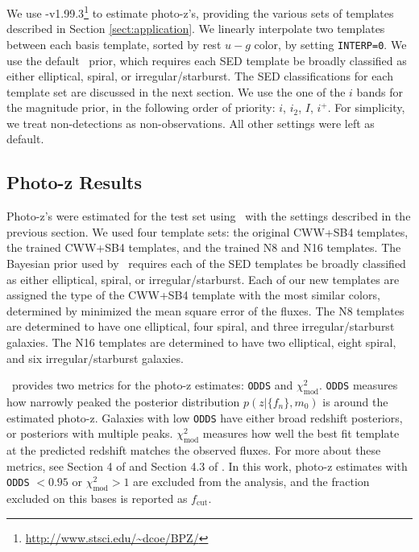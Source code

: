 We use \bpz-v1.99.3\footnote{\url{http://www.stsci.edu/~dcoe/BPZ/}} \citep{Benitez2000a} to estimate photo-z's, providing the various sets of templates described in Section \ref{sect:application}.
We linearly interpolate two templates between each basis template, sorted by rest $u-g$ color, by setting \texttt{INTERP=0}. 
We use the default \bpz\ prior, which requires each SED template be broadly classified as either elliptical, spiral, or irregular/starburst. 
The SED classifications for each template set are discussed in the next section. 
We use the one of the $i$ bands for the magnitude prior, in the following order of priority: $i$, $i_2$, $I$, $i^+$.
For simplicity, we treat non-detections as non-observations.
All other settings were left as default.

\subsection{Photo-z Results}
\label{sect:photoz_results}

Photo-z's were estimated for the test set using \bpz\ with the settings described in the previous section.
We used four template sets: the original CWW+SB4 templates, the trained CWW+SB4 templates, and the trained N8 and N16 templates.
The Bayesian prior used by \bpz\ requires each of the SED templates be broadly classified as either elliptical, spiral, or irregular/starburst.
Each of our new templates are assigned the type of the CWW+SB4 template with the most similar colors, determined by minimized the mean square error of the fluxes.
The N8 templates are determined to have one elliptical, four spiral, and three irregular/starburst galaxies.
The N16 templates are determined to have two elliptical, eight spiral, and six irregular/starburst galaxies.

\bpz\ provides two metrics for the photo-z estimates: \texttt{ODDS} and $\chi_{\text{mod}}^2$.
\texttt{ODDS} measures how narrowly peaked the posterior distribution $p(z|\{f_n\},m_0)$ is around the estimated photo-z.
Galaxies with low \texttt{ODDS} have either broad redshift posteriors, or posteriors with multiple peaks.
$\chi_{\text{mod}}^2$ measures how well the best fit template at the predicted redshift matches the observed fluxes. 
For more about these metrics, see Section 4 of \citet{Benitez2000a} and Section 4.3 of \citet{Coe2006a}.
In this work, photo-z estimates with \texttt{ODDS} $< 0.95$ or $\chi_{\text{mod}}^2 > 1$ are excluded from the analysis, and the fraction excluded on this bases is reported as $f_\text{cut}$.

